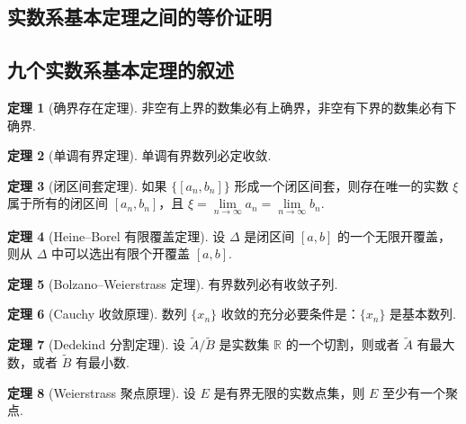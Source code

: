 \documentclass[zihao=-4,linespread=1.8,UTF8,nothm]{aytony_base}
\theoremstyle{definition}
\newtheorem{theoremsec}{\indent\heiti\textbf{定理}}[section]
\begin{document}
\begin{appendices}
    \section{实数系基本定理之间的等价证明}

    \subsection{九个实数系基本定理的叙述}

    \begin{theoremsec}[确界存在定理]
        非空有上界的数集必有上确界，非空有下界的数集必有下确界.
    \end{theoremsec}

    \begin{theoremsec}[单调有界定理]
        单调有界数列必定收敛.
    \end{theoremsec}

    \begin{theoremsec}[闭区间套定理]
        如果 $\{[a_n, b_n]\}$ 形成一个闭区间套，则存在唯一的实数 $\xi$ 属于所有的闭区间 $[a_n, b_n]$，且 $\xi = \lim\limits_{n \to \infty} a_n = \lim\limits_{n \to \infty} b_n$.
    \end{theoremsec}

    \begin{theoremsec}[Heine--Borel 有限覆盖定理]
        设 $\Delta$ 是闭区间 $[a, b]$ 的一个无限开覆盖，则从 $\Delta$ 中可以选出有限个开覆盖 $[a, b]$.
    \end{theoremsec}

    \begin{theoremsec}[Bolzano--Weierstrass 定理]
        有界数列必有收敛子列.
    \end{theoremsec}

    \begin{theoremsec}[Cauchy 收敛原理]
        数列 $\{x_n\}$ 收敛的充分必要条件是：$\{x_n\}$ 是基本数列.
    \end{theoremsec}

    \begin{theoremsec}[Dedekind 分割定理]
        设 $\tilde{A}/\tilde{B}$ 是实数集 $\mathbb{R}$ 的一个切割，则或者 $\tilde{A}$ 有最大数，或者 $\tilde{B}$ 有最小数.
    \end{theoremsec}

    \begin{theoremsec}[Weierstrass 聚点原理]
        设 $E$ 是有界无限的实数点集，则 $E$ 至少有一个聚点.
    \end{theoremsec}


\end{appendices}
\end{document}
